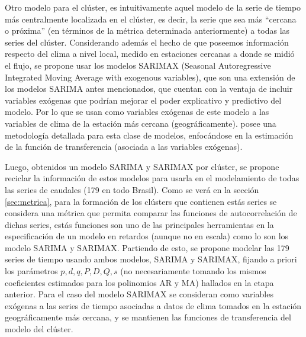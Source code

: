 \documentclass[12pt,oneside]{book}\usepackage[]{graphicx}\usepackage[]{color}
\theoremstyle{definition} %
\begin{document}
Otro modelo para el clúster, es intuitivamente aquel modelo de la serie de tiempo más centralmente localizada en el clúster, es decir, la serie que sea más ``cercana o próxima'' (en términos de la métrica determinada anteriormente) a todas las series del clúster. 
Considerando además el hecho de que poseemos información respecto del clima a nivel local, medido en estaciones cercanas a donde se midió el flujo, se propone usar los modelos SARIMAX (Seasonal Autoregressive Integrated Moving Average with exogenous variables), que son una extensión de los modelos SARIMA antes mencionados, que cuentan con la ventaja de incluir variables exógenas que podrían mejorar el poder explicativo y predictivo del modelo. 
Por lo que se usan como variables exógenas de este modelo a las variables de clima de la estación más cercana (geográficamente). \citeauthor{novales1993econometria} \citeyear{novales1993econometria} posee una metodología detallada para esta clase de modelos, enfocándose en la estimación de la función de transferencia (asociada a las variables exógenas). 





Luego, obtenidos un modelo SARIMA y SARIMAX por clúster, se propone reciclar la información de estos modelos para usarla en el modelamiento de todas las series de caudales (179 en todo Brasil). %
Como se verá en la sección \ref{sec:metrica}, para la formación de los clústers que contienen estás series se considera una métrica que permita comparar las funciones de autocorrelación de dichas series, estás funciones son uno de las principales herramientas en la especificación de un modelo en retardos (aunque no en escala) como lo son los modelo SARIMA y SARIMAX. 
Partiendo de esto, se propone modelar las 179 series de tiempo usando ambos modelos, SARIMA y SARIMAX, fijando a priori los parámetros $p,d,q,P,D,Q,s$ (no necesariamente tomando los mismos coeficientes estimados para los polinomios AR y MA) hallados en la etapa anterior. Para el caso del modelo SARIMAX se consideran  como variables exógenas a las series de tiempo asociadas a datos de clima tomados en la estación geográficamente más cercana, y se mantienen las funciones de transferencia del modelo del clúster.  
\end{document}
